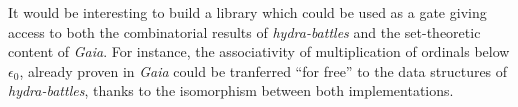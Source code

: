 \documentclass{easychair}
\begin{document}
It would be interesting to build a library which could be used as a gate giving access to both the combinatorial results of \textit{hydra-battles} and the set-theoretic content of \textit{Gaia}.
For instance, the associativity of multiplication of ordinals below $\epsilon_0$, already proven in \textit{Gaia} could be tranferred ``for free'' to the data structures of \textit{hydra-battles}, thanks to the isomorphism between both implementations.






\label{sect:bib}

%
%
%

\end{document}
